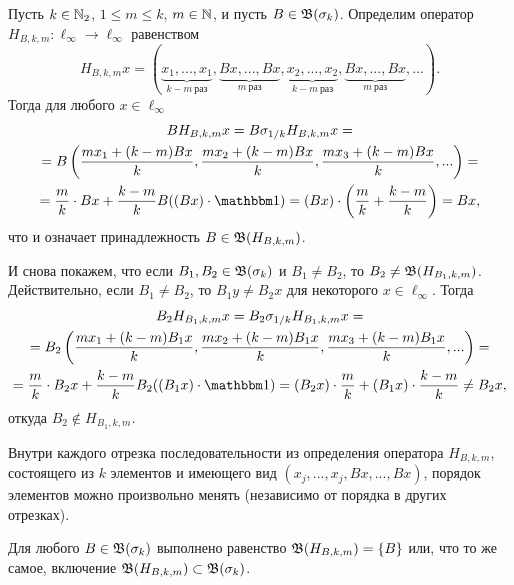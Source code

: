 \begin{example}
	Пусть $k\in \mathbb{N}_2$, $1 \leq m \leq k$, $m\in\mathbb{N}$, и пусть $B \in \mathfrak{B}(\sigma_k)$.
	Определим оператор $H_{B,k,m}:\ell_\infty \to \ell_\infty$ равенством
	\begin{equation}
		H_{B,k,m} x = (
			\underbrace{x_1, ..., x_1}_{k-m~\mbox{раз}}, \underbrace{Bx, ..., Bx}_{m~\mbox{раз}},
			\underbrace{x_2, ..., x_2}_{k-m~\mbox{раз}}, \underbrace{Bx, ..., Bx}_{m~\mbox{раз}},
			...)
		.
	\end{equation}
	Тогда для любого $x\in\ell_\infty$
	\begin{multline}
		B H_{B,k,m} x =
		B \sigma_{1/k} H_{B,k,m} x =
		\\=
		B\left(\dfrac{mx_1 + (k-m) Bx}{k}, \dfrac{mx_2 + (k-m) Bx}{k}, \dfrac{mx_3 + (k-m) Bx}{k}, ...\right)=
		\\=
		\dfrac{m}{k} \cdot Bx + \dfrac{k-m}{k} B ( (Bx)\cdot \mathbbm 1) =
		(Bx) \cdot \left(\dfrac m k + \dfrac{k-m}k \right) = Bx
		,
	\end{multline}
	что и означает принадлежность $B\in\mathfrak{B}(H_{B,k,m})$.

	И снова покажем, что если $B_1, B_2 \in \mathfrak{B}(\sigma_k)$ и $B_1 \ne B_2$, то $B_2 \ne \mathfrak{B} (H_{B_1,k,m})$.
	Действительно, если $B_1 \ne B_2$, то $B_1y \ne B_2x$ для некоторого $x\in\ell_\infty$.
	Тогда
	\begin{multline}
		B_2 H_{B_1,k,m} x =
		B_2 \sigma_{1/k} H_{B_1,k,m} x =
		\\=
		B_2\left(\dfrac{mx_1 + (k-m) B_1x}{k}, \dfrac{mx_2 + (k-m) B_1x}{k}, \dfrac{mx_3 + (k-m) B_1x}{k}, ...\right)=
		\\=
		\dfrac{m}{k} \cdot B_2x + \dfrac{k-m}{k} B_2 ( (B_1x)\cdot \mathbbm 1) =
		(B_2x) \cdot \dfrac m k + (B_1x)\cdot \dfrac{k-m}k \ne B_2x
		,
	\end{multline}
	откуда $B_2\notin H_{B_1,k,m}$.
\end{example}

\begin{remark}
	Внутри каждого отрезка последовательности из определения оператора $H_{B,k,m}$,
	состоящего из $k$ элементов и имеющего вид $(x_j, ..., x_j, Bx, ..., Bx)$,
	порядок элементов можно произвольно менять (независимо от порядка в других отрезках).
\end{remark}

\begin{hypothesis}
	Для любого $B\in\mathfrak{B}(\sigma_k)$ выполнено равенство $\mathfrak{B}(H_{B,k,m}) = \{B\}$ или, что то же самое,
	включение $\mathfrak{B}(H_{B,k,m}) \subset \mathfrak{B}(\sigma_k)$.
\end{hypothesis}

